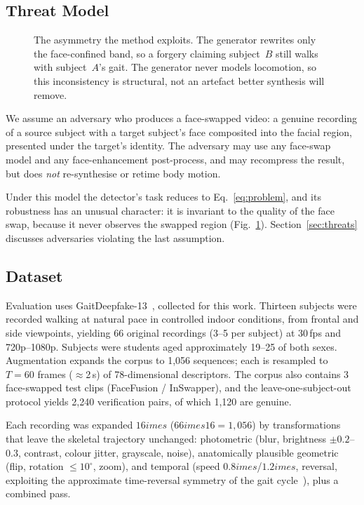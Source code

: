 \documentclass[conference]{IEEEtran}
\begin{document}
\subsection{Threat Model}
\label{sec:threat}

\begin{figure}[!tb]
\centering

\caption{The asymmetry the method exploits. The generator rewrites only the
face-confined band, so a forgery claiming subject~$B$ still walks with
subject~$A$'s gait. The generator never models locomotion, so this
inconsistency is structural, not an artefact better synthesis will remove.}
\label{fig:threat}
\end{figure}

We assume an adversary who produces a face-swapped video: a genuine recording
of a source subject with a target subject's face composited into the facial
region, presented under the target's identity. The adversary may use any
face-swap model and any face-enhancement post-process, and may recompress the
result, but does \emph{not} re-synthesise or retime body motion.

Under this model the detector's task reduces to Eq.~\ref{eq:problem}, and its
robustness has an unusual character: it is invariant to the quality of the face
swap, because it never observes the swapped region (Fig.~\ref{fig:threat}).
Section~\ref{sec:threats} discusses adversaries violating the last assumption.

\subsection{Dataset}
\label{sec:dataset}

Evaluation uses GaitDeepfake-13~\cite{gaitdeepfake13}, collected for this work.
Thirteen subjects were recorded walking at natural pace in controlled indoor
conditions, from frontal and side viewpoints, yielding 66 original recordings
(3--5 per subject) at 30\,fps and 720p--1080p. Subjects were students aged
approximately 19--25 of both sexes. Augmentation expands the corpus to
1{,}056 sequences; each is resampled to $T = 60$ frames ($\approx$2\,s) of
78-dimensional descriptors. The corpus also contains 3 face-swapped test clips
(FaceFusion / InSwapper), and the leave-one-subject-out protocol yields 2{,}240
verification pairs, of which 1{,}120 are genuine.

Each recording was expanded $16	imes$ ($66 	imes 16 = 1{,}056$) by transformations that leave the skeletal trajectory unchanged: photometric (blur, brightness $\pm0.2$--$0.3$, contrast, colour jitter, grayscale, noise), anatomically plausible geometric (flip, rotation $\le10^{\circ}$, zoom), and temporal (speed $0.8	imes$/$1.2	imes$, reversal, exploiting the approximate time-reversal symmetry of the gait cycle~\cite{perry_gait}), plus a combined pass.
\end{document}
